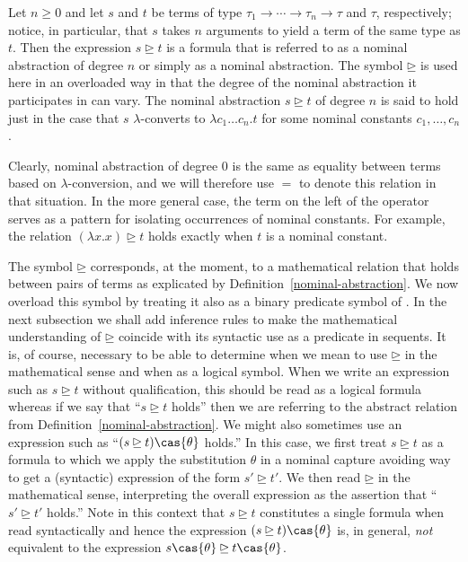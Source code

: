 \begin{definition}\label{nominal-abstraction}
Let $n\ge 0$ and
let $s$ and $t$ be terms of type $\tau_1 \to \cdots \to \tau_n \to
\tau$ and $\tau$, respectively; notice, in particular, that $s$ takes
$n$ arguments to yield a term of the same type as $t$.
Then the expression $s \unrhd t$ is a formula that is referred to as a
nominal abstraction of degree $n$ or simply as a nominal abstraction. The
symbol $\unrhd$ is used here in an overloaded way in that the degree
of the nominal abstraction it participates in can vary.
The nominal abstraction $s \unrhd t$ of degree $n$ is said to hold just in
the case that $s$ $\lambda$-converts to $\lambda c_1\ldots c_n.t$ for
some nominal constants $c_1,\ldots,c_n$.
\end{definition}

Clearly, nominal abstraction of degree $0$ is the same as equality
between terms based on $\lambda$-conversion, and we will therefore use
$=$  to denote this relation in that situation. In the more general
case,
the term on the left of the operator serves as a pattern for isolating
occurrences of nominal constants. For example, the relation $(\lambda
x.x) \unrhd t$ holds exactly when $t$ is a nominal constant.



The symbol $\unrhd$ corresponds, at the moment, to a mathematical
relation that holds between pairs of terms as explicated by
Definition~\ref{nominal-abstraction}. We now overload this symbol by
treating it also as a binary predicate symbol of \logic. In the next
subsection we shall add inference rules to make the mathematical
understanding of $\unrhd$ coincide with its syntactic use as a
predicate in sequents. It is, of course, necessary to be able to
determine when we mean to use $\unrhd$ in the mathematical sense and
when as a logical symbol. When we write an expression such as $s\unrhd
t$ without qualification, this should be read as a logical formula
whereas if we say that ``$s\unrhd t$ holds'' then we are referring to
the abstract relation from Definition~\ref{nominal-abstraction}. We
might also sometimes use an expression such as ``$(s\unrhd
t)\cas{\theta}$ holds.'' In this case, we first treat $s \unrhd t$ as
a formula to which we apply the substitution $\theta$ in a nominal
capture avoiding way to get a (syntactic) expression of the form
$s'\unrhd t'$. We then read $\unrhd$ in the mathematical sense,
interpreting the overall expression as the assertion that ``$s'\unrhd
t'$ holds.'' Note in this context that $s \unrhd t$ constitutes a
single formula when read syntactically and hence the expression
$(s\unrhd t)\cas{\theta}$ is, in general, {\it not} equivalent to the
expression $s\cas{\theta}\unrhd t\cas{\theta}$.

